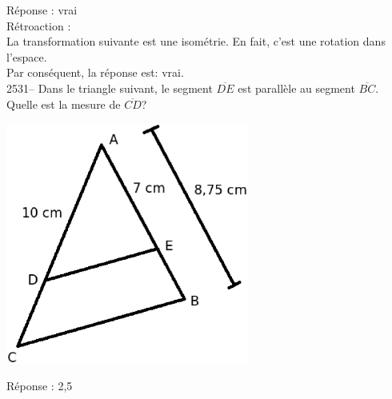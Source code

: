 \documentclass[letterpaper, 12pt]{article}
\begin{document}
R\'eponse : vrai\\

R\'etroaction :\\
La transformation suivante est une isom\'etrie. En fait, c'est une rotation dans l'espace.\\
Par cons\'equent, la r\'eponse est: vrai.\\

2531-- Dans le triangle suivant, le segment $\overline{DE}$ est parall\`ele au segment $\overline{BC}$. Quelle est la mesure de $\overline{CD}$?\\
\begin{center}
 \includegraphics[width=8cm,bb=0 439 538 842]{Q2531.eps}
\end{center}

R\'eponse : 2,5\\
\end{document}

